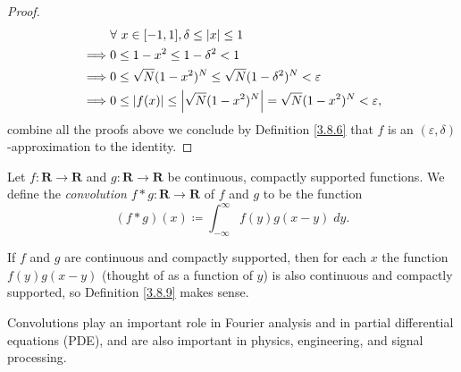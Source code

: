 \begin{proof}
    \begin{align*}
                 & \forall\ x \in [-1, 1], \delta \leq \abs*{x} \leq 1                                       \\
        \implies & 0 \leq 1 - x^2 \leq 1 - \delta^2 < 1                                                      \\
        \implies & 0 \leq \sqrt{N} (1 - x^2)^N \leq \sqrt{N} (1 - \delta^2)^N < \varepsilon                  \\
        \implies & 0 \leq \abs*{f(x)} \leq \abs*{\sqrt{N} (1 - x^2)^N} = \sqrt{N} (1 - x^2)^N < \varepsilon,
    \end{align*}
    combine all the proofs above we conclude by Definition \ref{3.8.6} that \(f\) is an \((\varepsilon, \delta)\)-approximation to the identity.
\end{proof}

\begin{definition}[Convolution]\label{3.8.9}
    Let \(f : \mathbf{R} \to \mathbf{R}\) and \(g : \mathbf{R} \to \mathbf{R}\) be continuous, compactly supported functions.
    We define the \emph{convolution} \(f * g : \mathbf{R} \to \mathbf{R}\) of \(f\) and \(g\) to be the function
    \[
        (f * g)(x) \coloneqq \int_{-\infty}^\infty f(y) g(x - y) \; dy.
    \]
\end{definition}

\begin{note}
    If \(f\) and \(g\) are continuous and compactly supported, then for each \(x\) the function \(f(y) g(x - y)\) (thought of as a function of \(y\)) is also continuous and compactly supported, so Definition \ref{3.8.9} makes sense.
\end{note}

\begin{remark}\label{3.8.10}
    Convolutions play an important role in Fourier analysis and in partial differential equations (PDE), and are also important in physics, engineering, and signal processing.
\end{remark}

